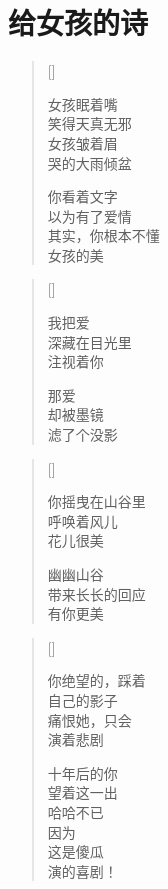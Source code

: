\chapter{给女孩的诗}
\thispagestyle{empty}
\renewcommand{\poemtoc}{section}
\settowidth{\versewidth}{女孩眠着嘴}
\begin{verse}[\versewidth]

女孩眠着嘴\\
笑得天真无邪\\
女孩皱着眉\\
哭的大雨倾盆

你看着文字\\
以为有了爱情\\
其实，你根本不懂\\
女孩的美
\end{verse}

\settowidth{\versewidth}{女孩眠着嘴}
\begin{verse}[\versewidth]

我把爱\\
深藏在目光里\\
注视着你

那爱\\
却被墨镜\\
滤了个没影
\end{verse}

\settowidth{\versewidth}{女孩眠着嘴}
\begin{verse}[\versewidth]

你摇曳在山谷里\\
呼唤着风儿\\
花儿很美

幽幽山谷\\
带来长长的回应\\
有你更美
\end{verse}
\newpage

\settowidth{\versewidth}{你绝望的，踩着}
\begin{verse}[\versewidth]

你绝望的，踩着\\
自己的影子\\
痛恨她，只会\\
演着悲剧

十年后的你\\
望着这一出\\
哈哈不已\\
因为\\
这是傻瓜\\
演的喜剧！
\end{verse}


